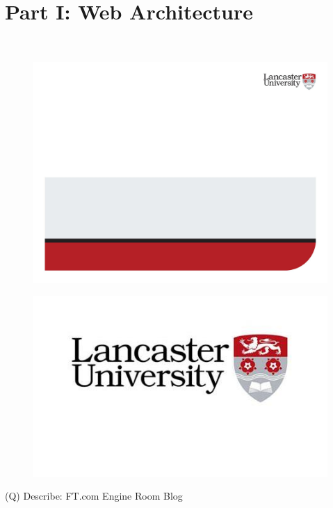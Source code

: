 \documentclass[12pt]{article}
\begin{document}
\section{Part I: Web Architecture}
\\
\begin{figure}[H]
\includegraphics[width=0.5\linewidth]{page16-image-1.png}
\end{figure}
\begin{figure}[H]
\includegraphics[width=0.5\linewidth]{page16-image-2.png}
\end{figure}
\clearpage
(Q)
Describe: FT.com Engine Room Blog
\clearpage
\end{document}
